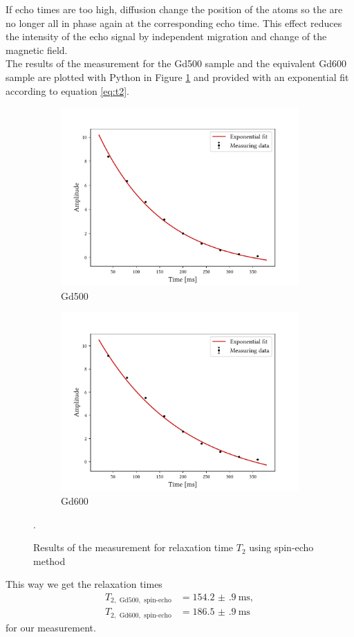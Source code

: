 If echo times are too high, diffusion change the position of the atoms so the are no longer all in phase again at the corresponding echo time.
This effect reduces the intensity of the echo signal by independent migration and change of the magnetic field.\\
The results of the measurement for the Gd500 sample and the equivalent Gd600 sample are plotted with Python in Figure \ref{fig:t2se} and provided with an exponential fit according to equation \ref{eq:t2}.
\begin{figure}[ht]
\begin{subfigure}{.45\textwidth}
\includegraphics[width=9.3cm]{..//figures//f61_abb_2.pdf}
\caption{Gd500}
\end{subfigure}
\qquad
\begin{subfigure}{.45\textwidth}
\includegraphics[width=9.3cm]{..//figures//f61_abb_2_600.pdf}
\caption{Gd600}
\end{subfigure}
\caption{Results of the measurement for relaxation time $T_2$ using spin-echo method}.
\label{fig:t2se}
\end{figure}
This way we get the relaxation times
\begin{align*}
T_{2,\text{ Gd500},\text{ spin-echo}}&=\SI{154.2(9)}{\milli\second},\\
T_{2,\text{ Gd600},\text{ spin-echo}}&=\SI{186.5(9)}{\milli\second}
\end{align*}
for our measurement.

